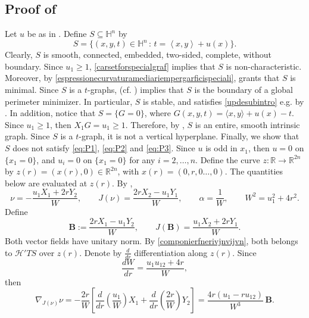 \documentclass[11pt]{amsart}
\renewcommand{\geq}{\geqslant}
\newcommand{\hhh}{{\mathcal{H}}}
\newcommand{\rr}{{\mathbb{R}}}
\newcommand{\hh}{{\mathbb{H}}}
\theoremstyle{definition}
\theoremstyle{remark}
\numberwithin{equation}{section}
\begin{document}
\subsection{Proof of }
Let $u$ be as in . Define $S\subseteq\hh^n$ by
\begin{equation*}\label{il_controesempio}
        S=\{(x,y,t) \in \hh^n\, :\,t=\left\langle x,y\right\rangle+u(x)\}.
    \end{equation*}
   Clearly, $S$ is smooth, connected, embedded, two-sided, complete, without boundary. Since $u_1\geq 1$, \eqref{carsetforspecialgraf} implies that $S$ is non-characteristic. Moreover, by \eqref{espressionecurvaturamediariempergarficispeciali},  grants that $S$ is minimal. Since $S$ is a $t$-graphs, \cite[Example 2.6]{MR2333095} (cf. \cite[Theorem 2.3]{MR2333095}) implies that $S$ is the boundary of a global perimeter minimizer. In particular, $S$ is stable, and satisfies \eqref{updesubintro} e.g. by \cite[Theorem 2.2]{psv}. In addition, notice that $S=\{G=0\}$, where $G(x,y,t)=\langle x,y\rangle+u(x)-t$. Since $u_1\geq 1$, then $X_1 G= u_1\geq 1$. Therefore, by , $S$ is an entire, smooth intrinsic graph.  Since $S$ is a $t$-graph, it is not a vertical hyperplane.
Finally, we show that $S$ does not satisfy \eqref{eq:P1}, \eqref{eq:P2} and \eqref{eq:P3}.
Since $u$ is odd in $x_1$, then
$u=0$ on $\{x_1=0\}$, and $u_i=0$ on $\{x_1=0\}$ for any $i=2,\ldots,n$. Define the curve $z:\rr\to\rr^{2n}$ by $z(r)=(x(r),0)\in\rr^{2n}$, with $x(r)=(0,r,0\ldots,0)$. The quantities below are evaluated at $z(r)$. By , 
\begin{equation}\label{componierfnerivjnvijvn}
      \nu=-\frac{u_1X_1+2rY_2}{W},
    \qquad
    J(\nu)=\frac{2rX_2-u_1Y_1}{W},
    \qquad
    \alpha=\frac1W,
    \qquad
    W^2=u_1^2+4r^2.
\end{equation}
Define
\[
    \mathbf B:=\frac{2rX_1-u_1Y_2}{W},
    \qquad
    J(\mathbf B)=\frac{u_1X_2+2rY_1}{W}.
\]
Both vector fields have unitary norm. By \eqref{componierfnerivjnvijvn}, both belongs to $\hhh' TS$ over $z(r)$. Denote by $\frac{d}{dr}$ differentiation along $z(r)$. Since
\[
    \frac{dW}{dr}=\frac{u_1u_{12}+4r}{W},
\]
then
\begin{equation*}
    \nabla_{J(\nu)}\nu
    =-\frac{2r}{W}
      \left[
        \frac{d}{dr}\left(\frac{u_1}{W}\right)X_1
        +\frac{d}{dr}\left(\frac{2r}{W}\right)Y_2
      \right]=\frac{4r(u_1-ru_{12})}{W^3}\,\mathbf B.
\end{equation*}
\end{document}
